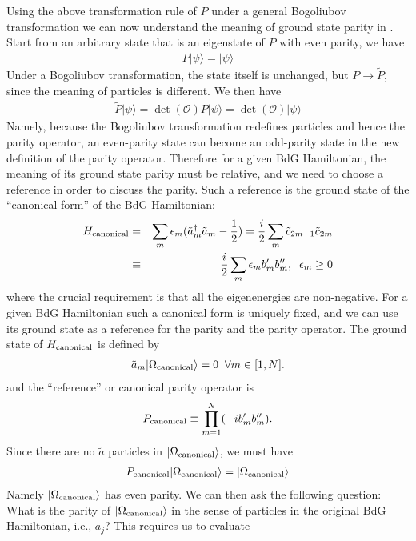 Using the above transformation rule of $P$ under a general Bogoliubov transformation we can now understand the meaning of ground state parity in \cite{kitaevUnpairedMajoranaFermions2001}. Start from an arbitrary state that is an eigenstate of $P$ with even parity, we have
\begin{eqnarray}
	P |\psi\rangle = |\psi\rangle
\end{eqnarray}
Under a Bogoliubov transformation, the state itself is unchanged, but $P\rightarrow \tilde{P}$, since the meaning of particles is different. We then have
\begin{eqnarray}
	\tilde{P} |\psi\rangle = \det(\mathcal{O})P |\psi\rangle = \det(\mathcal{O})|\psi\rangle
\end{eqnarray}
Namely, because the Bogoliubov transformation redefines particles and hence the parity operator, an even-parity state can become an odd-parity state in the new definition of the parity operator. Therefore for a given BdG Hamiltonian, the meaning of its ground state parity must be relative, and we need to choose a reference in order to discuss the parity. Such a reference is the ground state of the ``canonical form'' of the BdG Hamiltonian:
\begin{eqnarray}
	H_{\rm canonical} &=& \sum_{m} \epsilon_m (\tilde{a}_m^\dag \tilde{a}_m - \frac{1}{2}) = \frac{i}{2}\sum_{m}\tilde{c}_{2m-1} \tilde{c}_{2m} \\\nonumber
	&\equiv& \frac{i}{2}\sum_{m}\epsilon_m b'_m b''_{m},\;\; \epsilon_m\geq 0
\end{eqnarray}
where the crucial requirement is that all the eigenenergies are non-negative. For a given BdG Hamiltonian such a canonical form is uniquely fixed, and we can use its ground state as a reference for the parity and the parity operator. The ground state of $H_{\rm canonical} $ is defined by
\begin{eqnarray}
	\tilde{a}_m|\Omega_{\rm canonical}\rangle = 0\;\; \forall m\in[1,N].
\end{eqnarray}
and the ``reference'' or canonical parity operator is
\begin{eqnarray}
	P_{\rm canonical} \equiv \prod_{m=1}^N (-ib'_m b''_m).
\end{eqnarray}
Since there are no $\tilde{a}$ particles in $|\Omega_{\rm canonical}\rangle$, we must have
\begin{eqnarray}
	P_{\rm canonical} |\Omega_{\rm canonical}\rangle = |\Omega_{\rm canonical}\rangle
\end{eqnarray}
Namely $|\Omega_{\rm canonical}\rangle $ has even parity. We can then ask the following question: What is the parity of $|\Omega_{\rm canonical}\rangle$ in the sense of particles in the original BdG Hamiltonian, i.e., $a_j$? This requires us to evaluate
